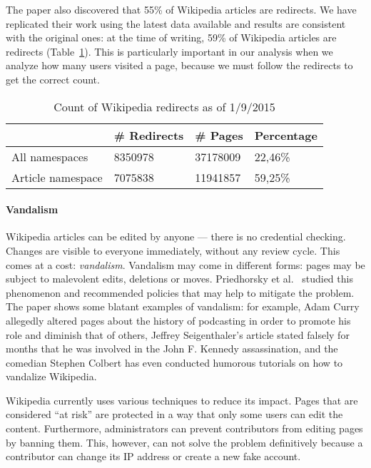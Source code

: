 The paper also discovered that 55\% of Wikipedia articles are redirects.
We have replicated their work using the latest data available and results are consistent with the original ones: at the time of writing, 59\% of Wikipedia articles are redirects (Table~\ref{tbl:redirects}).
This is particularly important in our analysis when we analyze how many users visited a page, because we must follow the redirects to get the correct count.

\begin{table}[]
\centering
\caption{Count of Wikipedia redirects as of 1/9/2015}
\label{tbl:redirects}
\begin{tabular}{llll}
\multicolumn{1}{c}{\textbf{}}          & \multicolumn{1}{c}{\textbf{\# Redirects}} & \multicolumn{1}{c}{\textbf{\# Pages}} & \textbf{Percentage} \\ \hline
\multicolumn{1}{l|}{All namespaces}    & 8350978                                & 37178009                               & 22,46\%             \\
\multicolumn{1}{l|}{Article namespace} & 7075838                                & 11941857                               & 59,25\%
\end{tabular}
\end{table}

\paragraph{Vandalism}
Wikipedia articles can be edited by anyone --- there is no credential checking.
Changes are visible to everyone immediately, without any review cycle.
This comes at a cost: \emph{vandalism}.
Vandalism may come in different forms: pages may be subject to malevolent edits, deletions or moves.
Priedhorsky et al.~\cite{Priedhorsky2007} studied this phenomenon and recommended policies that may help to mitigate the problem.
The paper shows some blatant examples of vandalism: for example, Adam Curry allegedly altered pages about the history of podcasting in order to promote his role and diminish that of others, Jeffrey Seigenthaler's article stated falsely for months that he was involved in the John F. Kennedy assassination, and the comedian Stephen Colbert has even conducted humorous tutorials on how to vandalize Wikipedia.

Wikipedia currently uses various techniques to reduce its impact.
Pages that are considered ``at risk'' are protected in a way that only some users can edit the content.
Furthermore, administrators can prevent contributors from editing pages by banning them.
This, however, can not solve the problem definitively because a contributor can change its IP address or create a new fake account.

